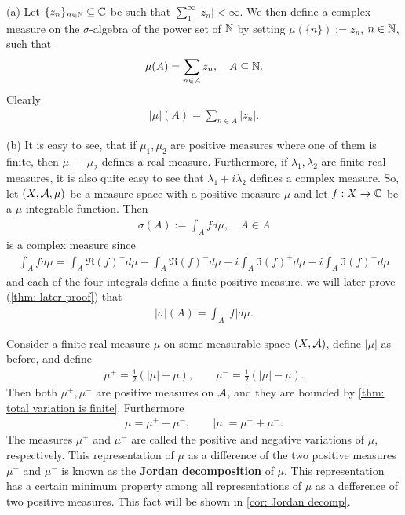 \documentclass[../../main.tex]{subfiles}
\begin{document}
\begin{example}\label{ex: example to prove}
(a) Let $\{z_{n}\}_{n\in \mathbb{N}}\subseteq \mathbb{C}$ be such that $\sum_{1}^{\infty}|z_{n}|<\infty$. We then define a complex measure on the $\sigma$-algebra of the power set of $\mathbb{N}$ by setting $\mu(\{n\}):=z_{n}$, $n\in \mathbb{N}$, such that
\begin{align*}
	\mu(A)=\sum_{n\in A}z_{n}, \quad A\subseteq \mathbb{N}.
\end{align*}
Clearly
\begin{align*}
	|\mu|(A)=\sum_{n\in A}|z_{n}|.
\end{align*}

(b)
It is easy to see, that if $\mu_{1}, \mu_{2}$ are positive measures where one of them is finite, then $\mu_{1}-\mu_{2}$ defines a real measure. Furthermore, if $\lambda_{1}, \lambda_{2}$ are finite real measures, it is also quite easy to see that $\lambda_{1}+i\lambda_{2}$ defines a complex measure. So, let $(X, \mathcal{A}, \mu)$ be a measure space with a positive measure $\mu$ and let $f:X\to \mathbb{C}$ be a $\mu$-integrable function. Then
\begin{align*}
	\sigma(A):=\int_{A}fd\mu, \quad A\in A
\end{align*}
is a complex measure since
\begin{align*}
	\int_{A}fd\mu=\int_{A}\mathfrak{R}(f)^{+}d\mu-\int_{A}\mathfrak{R}(f)^{-}d\mu+i\int_{A}\mathfrak{I}(f)^{+}d\mu-i\int_{A}\mathfrak{I}(f)^{-}d\mu
\end{align*}
and each of the four integrals define a finite positive measure.
we will later prove (\cref{thm: later proof}) that
\begin{align*}
	|\sigma|(A)=\int_{A}|f|d\mu.
\end{align*}
\end{example}


\begin{definition}\label{def: positive and negative variations}
Consider a finite real measure $\mu$ on some measurable space $(X, \mathcal{A})$, define $|\mu|$ as before, and define
\begin{align*}
	\mu^{+}=\frac{1}{2}(|\mu|+\mu), \qquad \mu^{-}=\frac{1}{2}(|\mu|-\mu).
\end{align*}
Then both $\mu^{+}, \mu^{-}$ are positive measures on $\mathcal{A}$, and they are bounded by \cref{thm: total variation is finite}. Furthermore
\begin{align*}
	\mu=\mu^{+}-\mu^{-}, \qquad |\mu|=\mu^{+}+\mu^{-}.
\end{align*}
The measures $\mu^{+}$ and $\mu^{-}$ are called the positive and negative variations of $\mu$, respectively. This representation of $\mu$ as a difference of the two positive measures $\mu^{+}$ and $\mu^{-}$ is known as the \textbf{Jordan decomposition } of $\mu$. This representation has a certain minimum property among all representations of $\mu$ as a defference of two positive measures. This fact will be shown in \cref{cor: Jordan decomp}.
\end{definition}
\end{document}
